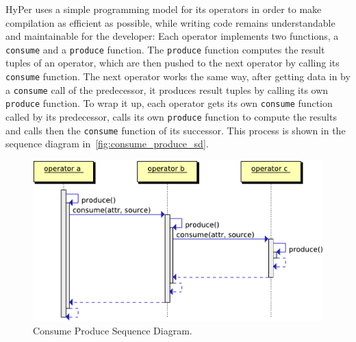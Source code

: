 HyPer uses a simple programming model for its operators in order to make  compilation as efficient as possible, while writing code remains understandable and maintainable for the developer: Each operator implements two functions, a \texttt{consume} and a \texttt{produce} function. The \texttt{produce} function computes the result tuples of an operator, which are then pushed to the next operator by calling its \texttt{consume} function. The next operator works the same way, after getting data in by a \texttt{consume} call of the predecessor, it produces result tuples by calling its own \texttt{produce} function. To wrap it up, each operator gets its own \texttt{consume} function called by its predecessor, calls its own \texttt{produce} function to compute the results and calls then the \texttt{consume} function of its successor. This process is shown in the sequence diagram in~\autoref{fig:consume_produce_sd}.


\begin{figure}[htsb]
  \centering
  \includegraphics[scale=0.7]{figures/consume_produce}
  \caption[Consume Produce Sequence Diagram]{Consume Produce Sequence Diagram.}\label{fig:consume_produce_sd}
\end{figure}



